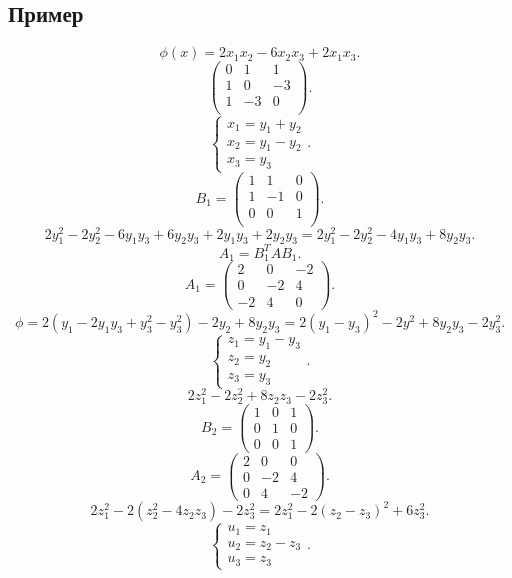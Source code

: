 \documentclass{scrartcl}
\begin{document}
\subsection{Пример}
\[
\phi(x) = 2x_1 x_2  - 6x_2x_3 + 2 x_1x_3
.\] 
\[
\begin{pmatrix} 
    0 & 1 & 1\\
    1 & 0 & -3\\
    1 & -3 & 0\\
\end{pmatrix} 
.\] 
\[
    \begin{cases}
        x_1 = y_1 + y_2\\
        x_2 = y_1 - y_2\\
        x_3 = y_3
    \end{cases}
.\] 
\[
B_1 =
\begin{pmatrix} 
    1 & 1 & 0\\
    1 & -1 & 0\\
    0 & 0 &  1\\
\end{pmatrix} 
.\] 
\[
2y_1^2 - 2y_2^2- 6 y_1y_3 + 6 y_2 y_3 + 2y_1y_3 + 2y_2 y_3 =
2y_1^2 - 2y_2^2 - 4y_1 y_3 + 8 y_2 y_3
.\] 
\[
A_1 = B_1^{T} A B_1
.\] 
\[
    A_1 = 
    \begin{pmatrix} 
        2 & 0 & -2\\
        0 & -2 & 4\\
        -2 & 4 & 0
    \end{pmatrix} 
.\] 
\[
\phi = 2(y_1 - 2y_1 y_3 + y_3^2 - y_3^2) - 2 y_2 + 8 y_2 y_3=
2(y_1 - y_3)^2 - 2y^2 + 8y_2y_3 - 2y_3^2
.\] 
\[
    \begin{cases}
z_1 = y_1 - y_3\\
z_2 = y_2\\
z_3 = y_3
    \end{cases}
.\] 
\[
2z_1^2 - 2z_2^2 + 8z_2z_3 - 2z_3^2
.\] 
\[
B_2 = 
\begin{pmatrix} 
    1 & 0 & 1\\
    0 & 1 & 0\\
    0 & 0 & 1
\end{pmatrix} 
.\] 
\[
A_2 =
\begin{pmatrix} 
    2 & 0 & 0\\
    0 & -2 & 4\\
    0 & 4 & -2
\end{pmatrix} 
.\] 
\[
2z_1^2 - 2 (z_2^2 - 4 z_2 z_3) - 2z_3^2 = 
2z_1^2 - 2(z_2-z_3) ^2 + 6z_3^2
.\] 
\[
\begin{cases}
    u_1 = z_1\\
    u_2 = z_2 - z_3\\
    u_3 = z_3
\end{cases}
.\] 
\end{document}
